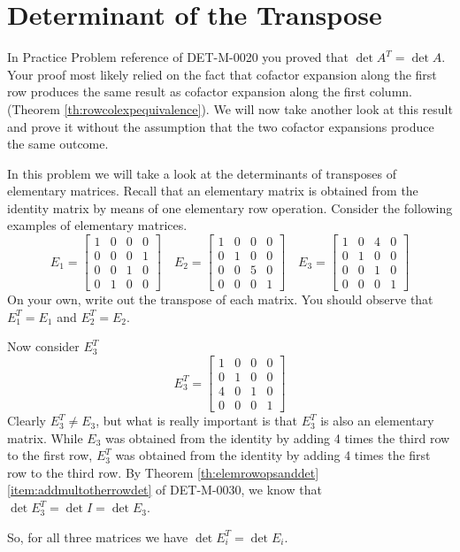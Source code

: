 \documentclass{ximera}
\begin{document}
\section*{Determinant of the Transpose}
In Practice Problem {\color{red}reference} of DET-M-0020 you proved that $\det{A^T}=\det{A}$.  Your proof most likely relied on the fact that cofactor expansion along the first row produces the same result as cofactor expansion along the first column.  (Theorem \ref{th:rowcolexpequivalence}).  We will now take another look at this result and prove it without the assumption that the two cofactor expansions produce the same outcome.
\begin{initprob}\label{init:detoftranspose}
In this problem we will take a look at the determinants of transposes of elementary matrices.  Recall that an elementary matrix is obtained from the identity matrix by means of one elementary row operation.  Consider the following examples of elementary matrices.
$$E_1=\begin{bmatrix}1&0&0&0\\0&0&0&1\\0&0&1&0\\0&1&0&0\end{bmatrix}\quad E_2=\begin{bmatrix}1&0&0&0\\0&1&0&0\\0&0&5&0\\0&0&0&1\end{bmatrix}\quad E_3=\begin{bmatrix}1&0&4&0\\0&1&0&0\\0&0&1&0\\0&0&0&1\end{bmatrix}$$
On your own, write out the transpose of each matrix.  You should observe that $E_1^T=E_1$ and $E_2^T=E_2$.  

Now consider $E_3^T$
$$E_3^T=\begin{bmatrix}1&0&0&0\\0&1&0&0\\4&0&1&0\\0&0&0&1\end{bmatrix}$$
Clearly $E_3^T\neq E_3$, but what is really important is that $E_3^T$ is also an elementary matrix.  While $E_3$ was obtained from the identity by adding 4 times the third row to the first row, $E_3^T$ was obtained from the identity by adding 4 times the first row to the third row.  By Theorem \ref{th:elemrowopsanddet}\ref{item:addmultotherrowdet} of DET-M-0030, we know that $\det{E_3^T}=\det{I}=\det{E_3}$.

So, for all three matrices we have $\det{E_i^T}=\det{E_i}$.
\end{initprob}
\end{document}
